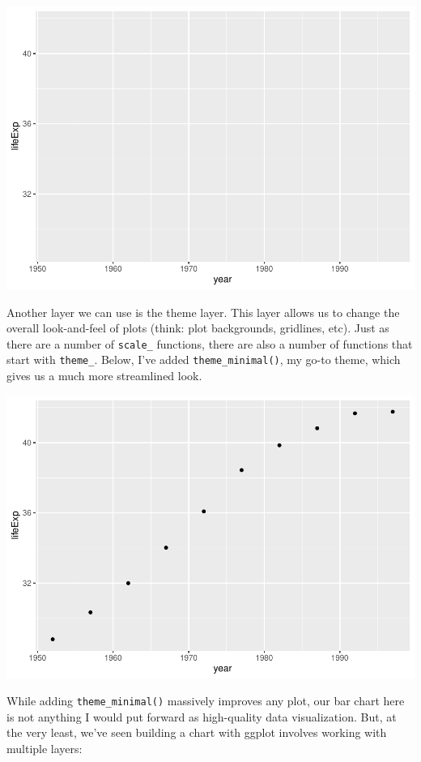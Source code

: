 \documentclass[
]{book}
\begin{document}
\includegraphics{data-viz_files/figure-latex/unnamed-chunk-10-1.pdf}

Another layer we can use is the theme layer. This layer allows us to change the overall look-and-feel of plots (think: plot backgrounds, gridlines, etc). Just as there are a number of \texttt{scale\_} functions, there are also a number of functions that start with \texttt{theme\_}. Below, I've added \texttt{theme\_minimal()}, my go-to theme, which gives us a much more streamlined look.

\includegraphics{data-viz_files/figure-latex/unnamed-chunk-11-1.pdf}

While adding \texttt{theme\_minimal()} massively improves any plot, our bar chart here is not anything I would put forward as high-quality data visualization. But, at the very least, we've seen building a chart with ggplot involves working with multiple layers:
\end{document}
